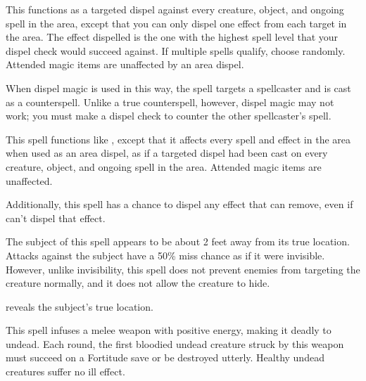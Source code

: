 \begin{spelleffect}
  \par This functions as a targeted dispel against every creature, object, and ongoing spell in the area, except that you can only dispel one effect from each target in the area. The effect dispelled is the one with the highest spell level that your dispel check would succeed against. If multiple spells qualify, choose randomly. Attended magic items are unaffected by an area dispel.

  \par {} When dispel magic is used in this way, the spell targets a spellcaster and is cast as a counterspell. Unlike a true counterspell, however, dispel magic may not work; you must make a dispel check to counter the other spellcaster's spell.
\end{spelleffect}

\begin{spelleffect}
  This spell functions like , except that it affects every spell and effect in the area when used as an area dispel, as if a targeted dispel had been cast on every creature, object, and ongoing spell in the area. Attended magic items are unaffected.
  \par Additionally, this spell has a chance to dispel any effect that  can remove, even if  can't dispel that effect.
\end{spelleffect}

\spellrng{\rngclose}
\begin{spelleffect}
  The subject of this spell appears to be about 2 feet away from its true location. Attacks against the subject have a 50\% miss chance as if it were invisible. However, unlike invisibility, this spell does not prevent enemies from targeting the creature normally, and it does not allow the creature to hide.
\end{spelleffect}
\begin{spellnotes}
     reveals the subject's true location.
\end{spellnotes}

\spellrng{\rngclose}
\spelldur{\durshort}
\begin{spelleffect}
  This spell infuses a melee weapon with positive energy, making it deadly to undead. Each round, the first bloodied undead creature struck by this weapon must succeed on a Fortitude save or be destroyed utterly. Healthy undead creatures suffer no ill effect.
\end{spelleffect}

